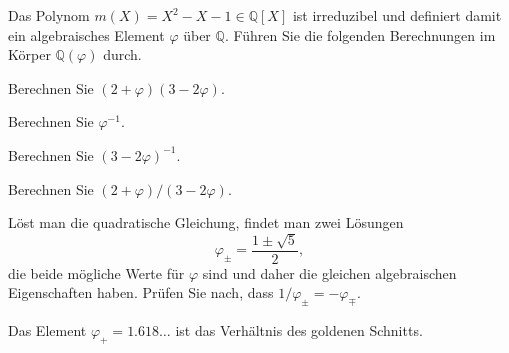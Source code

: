 Das Polynom $m(X)=X^2-X-1\in\mathbb{Q}[X]$ ist irreduzibel und definiert damit
ein algebraisches Element $\varphi$ über $\mathbb{Q}$.
Führen Sie die folgenden Berechnungen im Körper $\mathbb{Q}(\varphi)$
durch.
\begin{teilaufgaben}
\item Berechnen Sie $(2+\varphi)(3-2\varphi)$.
\item Berechnen Sie $\varphi^{-1}$.
\item Berechnen Sie $(3-2\varphi)^{-1}$.
\item Berechnen Sie $(2+\varphi)/(3-2\varphi)$.
\item Löst man die quadratische Gleichung, findet man zwei Lösungen
\[
\varphi_\pm
=
\frac{1\pm\!\sqrt{5}}2,
\]
die beide mögliche Werte für $\varphi$ sind und daher die gleichen
algebraischen Eigenschaften haben.
Prüfen Sie nach, dass $1/\varphi_\pm = -\varphi_\mp$.
\end{teilaufgaben}

\begin{hinweis}
Das Element $\varphi_+=1.618\dots $ ist das Verhältnis des goldenen Schnitts.
\end{hinweis}

